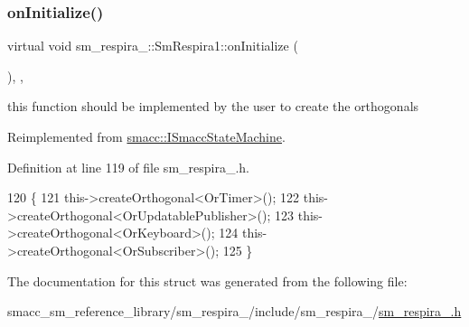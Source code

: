 \subsubsection{\texorpdfstring{on\+Initialize()}{onInitialize()}}
{\footnotesize\ttfamily virtual void sm\+\_\+respira\+\_\+::\+Sm\+Respira1\+::on\+Initialize (\begin{DoxyParamCaption}{ }\end{DoxyParamCaption})\hspace{0.3cm}{\ttfamily [inline]}, {\ttfamily [override]}, {\ttfamily [virtual]}}



this function should be implemented by the user to create the orthogonals 



Reimplemented from \hyperlink{classsmacc_1_1ISmaccStateMachine_ac2982c6c8283663e5e1e8a7c82f511ec}{smacc\+::\+I\+Smacc\+State\+Machine}.



Definition at line 119 of file sm\+\_\+respira\+\_.\+h.


\begin{DoxyCode}
120     \{
121         this->createOrthogonal<OrTimer>();
122         this->createOrthogonal<OrUpdatablePublisher>();
123         this->createOrthogonal<OrKeyboard>();
124         this->createOrthogonal<OrSubscriber>();
125     \}
\end{DoxyCode}


The documentation for this struct was generated from the following file\+:\begin{DoxyCompactItemize}
\item 
smacc\+\_\+sm\+\_\+reference\+\_\+library/sm\+\_\+respira\+\_/include/sm\+\_\+respira\+\_/\hyperlink{sm__respira__1_8h}{sm\+\_\+respira\+\_.\+h}\end{DoxyCompactItemize}
